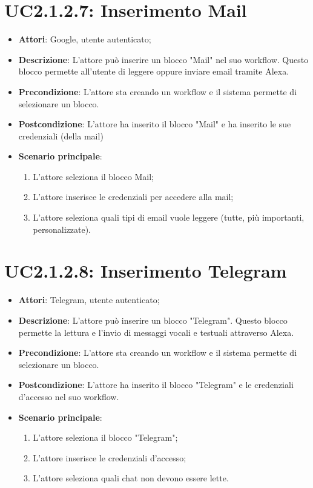 \section{UC2.1.2.7: Inserimento Mail}
\label{UC2.1.2.7}
\begin{itemize}
	\item \textbf{Attori}: Google, utente autenticato;
	\item \textbf{Descrizione}: L'attore può inserire un blocco "Mail" nel suo workflow. Questo blocco permette all'utente di leggere oppure inviare email tramite Alexa.
	\item \textbf{Precondizione}: L'attore sta creando un workflow e il sistema permette di selezionare un blocco.
	\item \textbf{Postcondizione}: L'attore ha inserito il blocco "Mail" e ha inserito le sue credenziali (della mail)
	\item \textbf{Scenario principale}:
	\begin{enumerate} \item L'attore seleziona il blocco Mail;  \item  L'attore inserisce le credenziali per accedere alla mail;  \item  L'attore seleziona quali tipi di email vuole leggere (tutte, più importanti, personalizzate).\end{enumerate}
\end{itemize}

\section{UC2.1.2.8: Inserimento Telegram}
\label{UC2.1.2.8}
\begin{itemize}
	\item \textbf{Attori}: Telegram, utente autenticato;
	\item \textbf{Descrizione}: L'attore può inserire un blocco "Telegram". Questo blocco permette la lettura e l'invio di messaggi vocali e testuali attraverso Alexa.
	\item \textbf{Precondizione}: L'attore sta creando un workflow e il sistema permette di selezionare un blocco.
	\item \textbf{Postcondizione}: L'attore ha inserito il blocco "Telegram" e le credenziali d'accesso nel suo workflow.
	\item \textbf{Scenario principale}:
	\begin{enumerate} \item L'attore seleziona il blocco "Telegram";  \item  L'attore inserisce le credenziali d'accesso;  \item  L'attore seleziona quali chat non devono essere lette.\end{enumerate}
\end{itemize}


